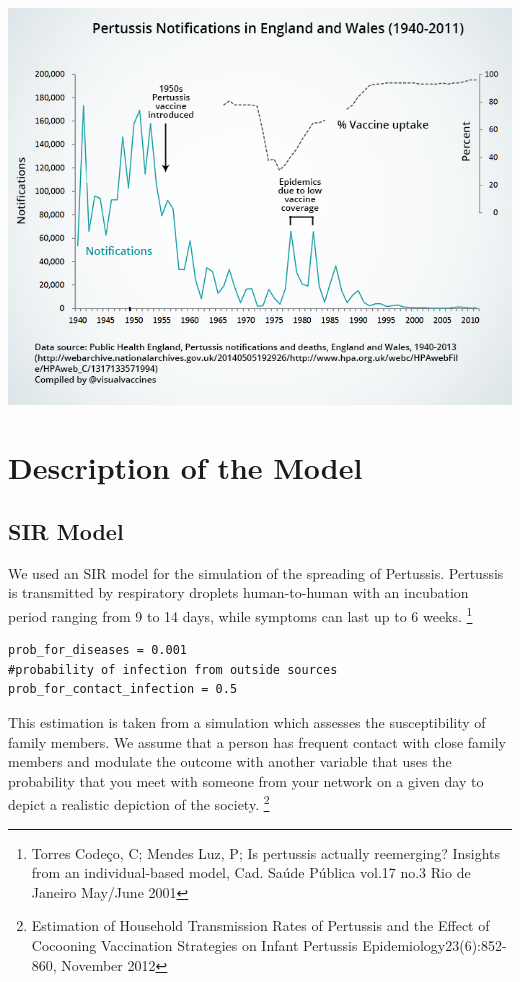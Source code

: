 \documentclass[11pt]{article}
\begin{document}
\begin{center}
\includegraphics[scale=0.4]{ukpertussis}
\end{center}


\section{Description of the Model}

\subsection{SIR Model}

We used an SIR model for the simulation of the spreading of Pertussis. Pertussis is transmitted by respiratory droplets human-to-human with an incubation period ranging from 9 to 14 days, while symptoms can last up to 6 weeks. \footnote{Torres Codeço, C; Mendes Luz, P; Is pertussis actually reemerging? Insights from an individual-based model, Cad. Saúde Pública vol.17 no.3 Rio de Janeiro May/June 2001}

\begin{lstlisting}
prob_for_diseases = 0.001 
#probability of infection from outside sources
prob_for_contact_infection = 0.5
\end{lstlisting}


This estimation is taken from a simulation which assesses the susceptibility of family members. We assume that a person has frequent contact with close family members and modulate the outcome with another variable that uses the probability that you meet with someone from your network on a given day to depict a realistic depiction of the society. 
\footnote{Estimation of Household Transmission Rates of Pertussis and the Effect of Cocooning Vaccination Strategies on Infant Pertussis Epidemiology23(6):852-860, November 2012}
\end{document}

